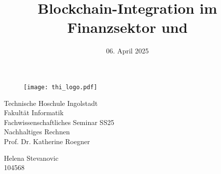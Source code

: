 \documentclass[
    11pt, 			%
]{article}
\title{Blockchain-Integration im Finanzsektor und }
\date{06. April 2025}
\begin{document}
    \pagestyle{plain}

    \begin{figure}
        \texttt{[image: thi\_logo.pdf]}
    \end{figure}
    \begin{center}
        Technische Hoschule Ingolstadt \\
        \vspace{5pt} 
        Fakultät Informatik \\
        \vspace{5pt} 
        Fachwissenschaftliches Seminar SS25 \\
        \vspace{5pt} 
        Nachhaltiges Rechnen \\
        \vspace{5pt} 
        Prof. Dr. Katherine Roegner
    \end{center}
    \begingroup
    \let\newpage\relax%
    \maketitle
    \endgroup

    \vspace{3cm}
    \begin{center}
        Helena Stevanovic \\
        104568
    \end{center}





    \thispagestyle{empty}

    \newpage
    

    \newpage
    \tableofcontents

    
    
    
    

    \listoffigures
    \newpage
    \printbibliography
\end{document}
